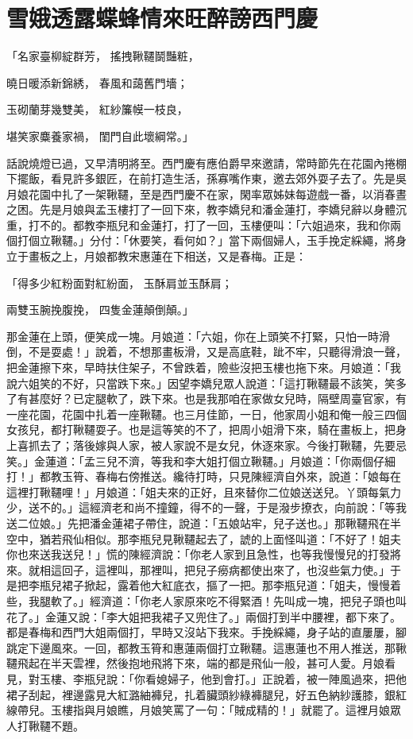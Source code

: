 %

\chapter{雪娥透露蝶蜂情\KG 來旺醉謗西門慶}

「名家臺柳綻群芳，  搖拽鞦韆鬬豔粧，

曉日暖添新錦綉，  春風和藹舊門墻；

玉砌蘭芽幾雙美，  紅紗簾幙一枝良，

堪笑家麋養家禍，  閨門自此壞綱常。」

話說燒燈已過，又早清明將至。西門慶有應伯爵早來邀請，常時節先在花園內捲棚下擺飯，看見許多銀匠，在前打造生活，孫寡嘴作東，邀去郊外耍子去了。先是吳月娘花園中扎了一架鞦韆，至是西門慶不在家，閑率眾姊妹每遊戲一番，以消春晝之困。先是月娘與孟玉樓打了一回下來，教李嬌兒和潘金蓮打，李嬌兒辭以身體沉重，打不的。都教李瓶兒和金蓮打，打了一回，玉樓便叫：「六姐過來，我和你兩個打個立鞦韆。」分付：「休要笑，看何如？」當下兩個婦人，玉手挽定綵繩，將身立于畫板之上，月娘都教宋惠蓮在下相送，又是春梅。正是：

「得多少紅粉面對紅紛面，  玉酥肩並玉酥肩；

兩雙玉腕挽腹挽，    四隻金蓮顛倒顛。」

那金蓮在上頭，便笑成一塊。月娘道：「六姐，你在上頭笑不打緊，只怕一時滑倒，不是耍處！」說着，不想那畫板滑，又是高底鞋，跐不牢，只聽得滑浪一聲，把金蓮擦下來，早時扶住架子，不曾跌着，險些沒把玉樓也拖下來。月娘道：「我說六姐笑的不好，只當跌下來。」因望李嬌兒眾人說道：「這打鞦韆最不該笑，笑多了有甚麼好？已定腿軟了，跌下來。也是我那咱在家做女兒時，隔壁周臺官家，有一座花園，花園中扎着一座鞦韆。也三月佳節，一日，他家周小姐和俺一般三四個女孩兒，都打鞦韆耍子。也是這等笑的不了，把周小姐滑下來，騎在畫板上，把身上喜抓去了；落後嫁與人家，被人家說不是女兒，休逐來家。今後打鞦韆，先要忌笑。」金蓮道：「孟三兒不濟，等我和李大姐打個立鞦韆。」月娘道：「你兩個仔細打！」都教玉筲、春梅右傍推送。纔待打時，只見陳經濟自外來，說道：「娘每在這裡打鞦韆哩！」月娘道：「姐夫來的正好，且來替你二位娘送送兒。丫頭每氣力少，送不的。」這經濟老和尚不撞鐘，得不的一聲，于是潑步撩衣，向前說：「等我送二位娘。」先把潘金蓮裙子帶住，說道：「五娘站牢，兒子送也。」那鞦韆飛在半空中，猶若飛仙相似。那李瓶兒見鞦韆起去了，諕的上面怪叫道：「不好了！姐夫你也來送我送兒！」慌的陳經濟說：「你老人家到且急性，也等我慢慢兒的打發將來。就相這回子，這裡叫，那裡叫，把兒子癆病都使出來了，也沒些氣力使。」于是把李瓶兒裙子掀起，露着他大紅底衣，摳了一把。那李瓶兒道：「姐夫，慢慢着些，我腿軟了。」經濟道：「你老人家原來吃不得緊酒！先叫成一塊，把兒子頭也叫花了。」金蓮又說：「李大姐把我裙子又兜住了。」兩個打到半中腰裡，都下來了。都是春梅和西門大姐兩個打，早時又沒站下我來。手挽綵繩，身子站的直屢屢，腳跳定下邊風來。一回，都教玉筲和惠蓮兩個打立鞦韆。這惠蓮也不用人推送，那鞦韆飛起在半天雲裡，然後抱地飛將下來，端的都是飛仙一般，甚可人愛。月娘看見，對玉樓、李瓶兒說：「你看媳婦子，他到會打。」正說着，被一陣風過來，把他裙子刮起，裡邊露見大紅潞紬褲兒，扎着臟頭紗綠褲腿兒，好五色納紗護膝，銀紅線帶兒。玉樓指與月娘瞧，月娘笑罵了一句：「賊成精的！」就罷了。這裡月娘眾人打鞦韆不題。

